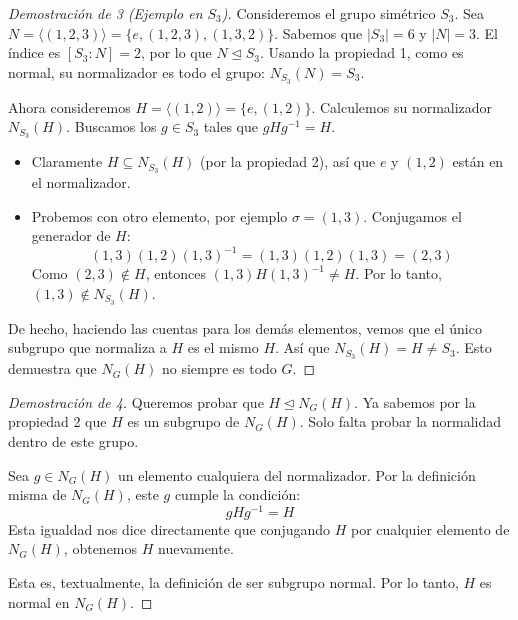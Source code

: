 \begin{proof}[Demostración de 3 (Ejemplo en $S_3$)]
    Consideremos el grupo simétrico $S_3$.
    Sea $N = \langle (1, 2, 3) \rangle = \{e, (1, 2, 3), (1, 3, 2)\}$.
    Sabemos que $|S_3| = 6$ y $|N| = 3$. El índice es $[S_3 : N] = 2$, por lo que $N \trianglelefteq S_3$.
    Usando la propiedad 1, como es normal, su normalizador es todo el grupo: $N_{S_3}(N) = S_3$.

    Ahora consideremos $H = \langle (1, 2) \rangle = \{e, (1, 2)\}$.
    Calculemos su normalizador $N_{S_3}(H)$. Buscamos los $g \in S_3$ tales que $gHg^{-1} = H$.
    \begin{itemize}
        \item Claramente $H \subseteq N_{S_3}(H)$ (por la propiedad 2), así que $e$ y $(1, 2)$ están en el normalizador.
        \item Probemos con otro elemento, por ejemplo $\sigma = (1, 3)$.
        Conjugamos el generador de $H$:
        \begin{equation*}
            (1, 3)(1, 2)(1, 3)^{-1} = (1, 3)(1, 2)(1, 3) = (2, 3)
        \end{equation*}
        Como $(2, 3) \notin H$, entonces $(1, 3)H(1, 3)^{-1} \neq H$.
        Por lo tanto, $(1, 3) \notin N_{S_3}(H)$.
    \end{itemize}
    De hecho, haciendo las cuentas para los demás elementos, vemos que el único subgrupo que normaliza a $H$ es el mismo $H$.
    Así que $N_{S_3}(H) = H \neq S_3$.
    Esto demuestra que $N_G(H)$ no siempre es todo $G$.
\end{proof}

\begin{proof}[Demostración de 4]
    Queremos probar que $H \trianglelefteq N_G(H)$.
    Ya sabemos por la propiedad 2 que $H$ es un subgrupo de $N_G(H)$. Solo falta probar la normalidad dentro de este grupo.
    
    Sea $g \in N_G(H)$ un elemento cualquiera del normalizador.
    Por la definición misma de $N_G(H)$, este $g$ cumple la condición:
    \begin{equation*}
        gHg^{-1} = H
    \end{equation*}
    Esta igualdad nos dice directamente que conjugando $H$ por cualquier elemento de $N_G(H)$, obtenemos $H$ nuevamente.
    
    Esta es, textualmente, la definición de ser subgrupo normal.
    Por lo tanto, $H$ es normal en $N_G(H)$.
\end{proof}

